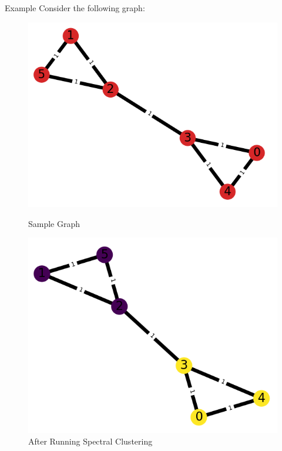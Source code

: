 \documentclass[hyperref, notheorems]{beamer}
\theoremstyle{definition}
\begin{document}
\begin{frame}{Example}
    Consider the following graph:
    \begin{figure}[ht]
        \begin{minipage}[b]{0.40\linewidth}
            \centering
            \includegraphics[width=\textwidth]{graphics/raw_g.png}
            \caption{Sample Graph}
            \label{fig:a}
        \end{minipage}
        \hspace{0.5cm}
        \begin{minipage}[b]{0.50\linewidth}
            \centering
            \includegraphics[width=\textwidth]{graphics/g.png}
            \caption{After Running Spectral Clustering}
            \label{fig:b}
        \end{minipage}
    \end{figure}
\end{frame}
\end{document}
